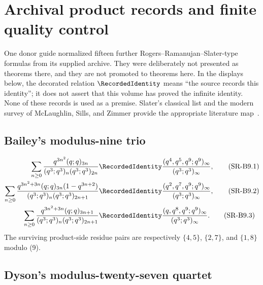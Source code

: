 \section{Archival product records and finite quality control}
\label{qg:sec-archival-product-records}

One donor guide normalized fifteen further Rogers--Ramanujan--Slater-type
formulas from its supplied archive.  They were deliberately not presented as
theorems there, and they are not promoted to theorems here.  In the displays
below, the decorated relation
\(\RecordedIdentity\) means ``the source records this
identity''; it does not assert that this volume has proved the infinite
identity.  None of these records is used as a premise.  Slater's classical
list and the modern survey of McLaughlin, Sills, and Zimmer provide the
appropriate literature map~\cite{Slater1952,McLaughlinSillsZimmer}.

\subsection{Bailey's modulus-nine trio}

\begin{align}
 \sum_{n\ge0}
 \frac{q^{3n^2}(q;q)_{3n}}
 {(q^3;q^3)_n(q^3;q^3)_{2n}}
 &\RecordedIdentity
 \frac{(q^4,q^5,q^9;q^9)_\infty}{(q^3;q^3)_\infty},
 \tag{SR-B9.1}\label{qg:eq-record-b9-1}\\
 \sum_{n\ge0}
 \frac{q^{3n^2+3n}(q;q)_{3n}(1-q^{3n+2})}
 {(q^3;q^3)_n(q^3;q^3)_{2n+1}}
 &\RecordedIdentity
 \frac{(q^2,q^7,q^9;q^9)_\infty}{(q^3;q^3)_\infty},
 \tag{SR-B9.2}\label{qg:eq-record-b9-2}\\
 \sum_{n\ge0}
 \frac{q^{3n^2+3n}(q;q)_{3n+1}}
 {(q^3;q^3)_n(q^3;q^3)_{2n+1}}
 &\RecordedIdentity
 \frac{(q,q^8,q^9;q^9)_\infty}{(q^3;q^3)_\infty}.
 \tag{SR-B9.3}\label{qg:eq-record-b9-3}
\end{align}
The surviving product-side residue pairs are respectively
\(\{4,5\}\), \(\{2,7\}\), and \(\{1,8\}\) modulo (9).

\subsection{Dyson's modulus-twenty-seven quartet}

